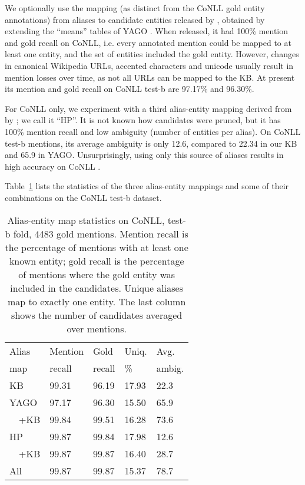 We optionally use the mapping (as distinct from the
CoNLL gold entity annotations) from aliases to candidate entities released
by , obtained by extending the
``means'' tables of YAGO \cite{hoffart2013yago2}.  When released,
it had 100\% mention and gold recall on CoNLL, i.e. every annotated mention
could be mapped to at least one entity, and the set of entities included the gold entity. 
However, changes in canonical Wikipedia URLs, accented characters and
unicode usually result in mention losses over time, as not all URLs can be mapped to the KB.
At present its mention and gold recall on CoNLL test-b are 97.17\% and 96.30\%.

For CoNLL only, we experiment with a third alias-entity mapping derived 
from  by ; we call it ``HP''.  
It is not known how candidates were pruned, but it has 100\% mention recall
and low ambiguity (number of entities per alias).
On CoNLL test-b mentions, its average ambiguity is only 12.6, compared to 22.34 in our KB
and 65.9 in YAGO.  Unsurprisingly, using only this source of aliases results in
high accuracy on CoNLL \cite{Pershina2015,YamadaS0T16}.

Table~\ref{tab:AliasTable} lists the statistics of the three alias-entity mappings
and some of their combinations on the CoNLL test-b dataset.


\begin{table}
  \centering
  \begin{tabular}{l|l|l|l|l}
    Alias  & Mention &   Gold  & Uniq.  & Avg.  \\
    map    & recall  & recall  & \%     & ambig. \\
    \hline
    KB     & 99.31 & 96.19 & 17.93 & 22.3 \\
    \hline
    YAGO   & 97.17 & 96.30 & 15.50 & 65.9 \\
    ~~+KB  & 99.84 & 99.51 & 16.28 & 73.6 \\
    \hline
    HP     & 99.87 & 99.84 & 17.98 & 12.6 \\
    ~~+KB  & 99.87 & 99.87 & 16.40 & 28.7 \\
    \hline
    All    & 99.87 & 99.87 & 15.37 & 78.7
  \end{tabular}
  \caption{Alias-entity map statistics on CoNLL, test-b
    fold, 4483 gold mentions.  Mention recall is the percentage of
    mentions with at least one known entity; gold recall is the percentage
    of mentions where the gold entity was included in the candidates.
    Unique aliases map to exactly one entity.  The last column
    shows the number of candidates averaged over mentions.}
  \label{tab:AliasTable}
\end{table}



